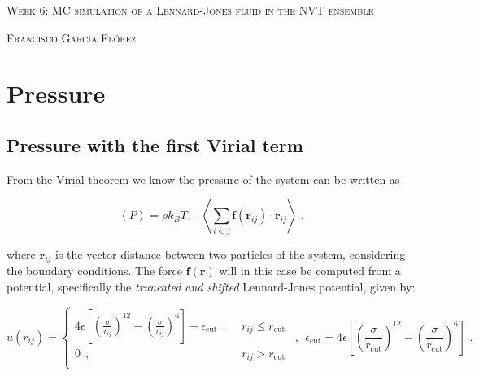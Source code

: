\documentclass[10 pt]{article}
\newcommand{\avg}[1]{\left\langle #1 \right\rangle}
\renewcommand{\vec}[1]{\pmb{#1}}
\begin{document}

\begin{center}
  \Large \textsc{Week 6: MC simulation of a Lennard-Jones fluid in the NVT ensemble}
\end{center}

\begin{center}
  \large \textsc{Francisco García Flórez}
\end{center}

\section{Pressure}

\subsection{Pressure with the first Virial term}

From the Virial theorem we know the pressure of the system can be written as

$$ \avg{P} = \rho k_B T + \avg{\sum_{i<j} \vec{f}(\vec{r}_{ij}) \cdot \vec{r}_{ij}} \text{ ,} $$

where $\vec{r}_{ij}$ is the vector distance between two particles of the system, considering the boundary conditions. The force $\vec{f}(\vec{r})$ will in this case be computed from a potential, specifically the \emph{truncated and shifted} Lennard-Jones potential, given by:

$$ u(r_{ij}) = \left\{
    \begin{alignedat}{2}
      4 \epsilon \left[ \left( \frac{\sigma}{r_{ij}} \right)^{12} - \left( \frac{\sigma}{r_{ij}} \right)^6 \right] - \epsilon_{\text{cut}} ~~, & ~~ r_{ij} \leq r_{\text{cut}} \\
      0 ~~, & ~~ r_{ij} > r_{\text{cut}} \\
    \end{alignedat}
  \right. ~~, ~~ \epsilon_{\text{cut}} =  4 \epsilon \left[ \left( \frac{\sigma}{r_{\text{cut}}} \right)^{12} - \left( \frac{\sigma}{r_{\text{cut}}} \right)^6 \right] \text{ .}
$$
\end{document}

